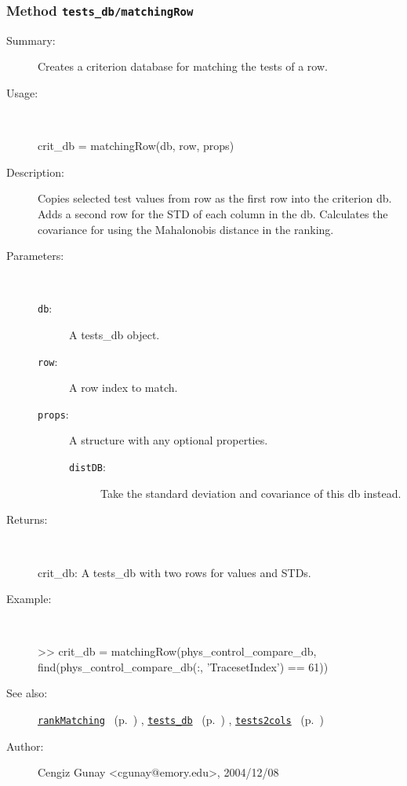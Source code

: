 \subsubsection[Method \texttt{matchingRow}]{Method \texttt{tests\_db/matchingRow}}%
%
\label{ref_tests_db__matchingRow}%
\hypertarget{ref_tests_db__matchingRow}{}%
\begin{description}
\item[Summary:]Creates a criterion database for matching the tests of a row.
%
\item[Usage:]~%
\begin{lyxcode}%
crit\_db = matchingRow(db, row, props)
%
\end{lyxcode}%
%
\item[Description:]%
Copies selected test values from row as the first row into the criterion
 db. Adds a second row for the STD of each column in the db.  Calculates the
 covariance for using the Mahalonobis distance in the ranking.
\item[Parameters:]~
\begin{description}%
\item[\texttt{db}:]
 A tests\_db object.
\item[\texttt{row}:]
 A row index to match.
\item[\texttt{props}:]
 A structure with any optional properties.
\begin{description}%
\item[\texttt{distDB}:]
 Take the standard deviation and covariance of this db instead.
\end{description}%
\end{description}%
%
\item[Returns:
]~

	crit\_db: A tests\_db with two rows for values and STDs.
%
\item[Example:]~
\begin{lyxcode}        >> crit\_db = matchingRow(phys\_control\_compare\_db, 
\\%
                find(phys\_control\_compare\_db(:, 'TracesetIndex') == 61))
\\%
\end{lyxcode}
%
\item[See also:]%
\hyperlink{ref_rankMatching}{\texttt{rankMatching}}%
\ (p.~\pageref{ref_rankMatching})%
%
, \hyperlink{ref_tests_db}{\texttt{tests\_db}}%
\ (p.~\pageref{ref_tests_db})%
%
, \hyperlink{ref_tests2cols}{\texttt{tests2cols}}%
\ (p.~\pageref{ref_tests2cols})%
%
%
\item[Author:]%
Cengiz Gunay <cgunay@emory.edu>, 2004/12/08
%
\end{description}
\methodline%
